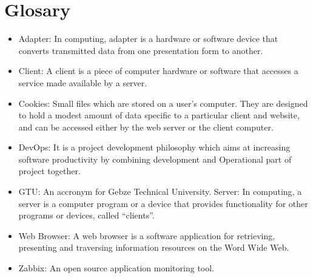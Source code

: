 \documentclass{article}
\begin{document}
\section{Glosary}
\begin{itemize}
\item[]Adapter: In computing, adapter is a hardware or software device that converts transmitted data from one presentation form to another.
\item[] Client: A client is a piece of computer hardware or software that accesses a service made available by a server.
\item[] Cookies: Small files which are stored on a user's computer. They are  designed to hold a modest amount of data specific to a particular client and website, and can be accessed either by the web server or the client computer.
\item[] DevOps: It is a project development philosophy which aims at increasing software         
            productivity by combining development and Operational part of project  together.
\item[]GTU: An accronym for Gebze Technical University.
Server: In computing, a server is a computer program or a device that provides functionality for other programs or devices, called “clients”.
\item[] Web Browser: A web browser is a software application for retrieving, presenting and traversing information resources on the Word Wide Web.
\item[] Zabbix: An open source application monitoring tool.
\end{itemize}
\end{document}
